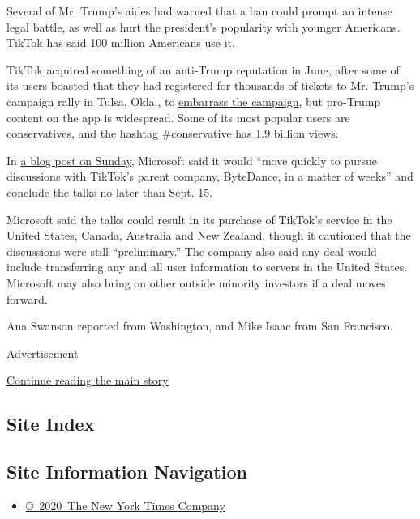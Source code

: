 Several of Mr. Trump's aides had warned that a ban could prompt an
intense legal battle, as well as hurt the president's popularity with
younger Americans. TikTok has said 100 million Americans use it.

TikTok acquired something of an anti-Trump reputation in June, after
some of its users boasted that they had registered for thousands of
tickets to Mr. Trump's campaign rally in Tulsa, Okla., to
\href{https://www.nytimes3xbfgragh.onion/2020/06/21/style/tiktok-trump-rally-tulsa.html}{embarrass
the campaign}, but pro-Trump content on the app is widespread. Some of
its most popular users are conservatives, and the hashtag \#conservative
has 1.9 billion views.

In
\href{https://blogs.microsoft.com/blog/2020/08/02/microsoft-to-continue-discussions-on-potential-tiktok-purchase-in-the-united-states/}{a
blog post on Sunday}, Microsoft said it would ``move quickly to pursue
discussions with TikTok's parent company, ByteDance, in a matter of
weeks'' and conclude the talks no later than Sept. 15.

Microsoft said the talks could result in its purchase of TikTok's
service in the United States, Canada, Australia and New Zealand, though
it cautioned that the discussions were still ``preliminary.'' The
company also said any deal would include transferring any and all user
information to servers in the United States. Microsoft may also bring on
other outside minority investors if a deal moves forward.

Ana Swanson reported from Washington, and Mike Isaac from San Francisco.

Advertisement

\protect\hyperlink{after-bottom}{Continue reading the main story}

\hypertarget{site-index}{%
\subsection{Site Index}\label{site-index}}

\hypertarget{site-information-navigation}{%
\subsection{Site Information
Navigation}\label{site-information-navigation}}

\begin{itemize}
\tightlist
\item
  \href{https://help.nytimes3xbfgragh.onion/hc/en-us/articles/115014792127-Copyright-notice}{©~2020~The
  New York Times Company}
\end{itemize}

